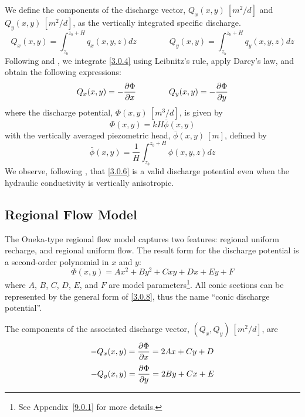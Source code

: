 \documentclass[12pt]{report}
\providecommand{\pderiv}[2]{\frac{\mathinner{\partial#1}}{\mathinner{\partial#2}}}
\begin{document}
We define the components of the discharge vector, $Q_x(x,y)~[m^2/d]$ and $Q_y(x,y)~[m^2/d]$, as the vertically integrated specific discharge.
%
\begin{equation}\label{3.0.4}
    Q_x(x,y) = \int_{z_b}^{z_b+H} q_x(x,y,z) dz
	\qquad \qquad
    Q_y(x,y) = \int_{z_b}^{z_b+H} q_y(x,y,z) dz
\end{equation}
%
Following \citet[p. 77-78]{Bear1979} and \citet{Strack06}, we integrate \eqref{3.0.4} using Leibnitz's rule, apply Darcy's law, and obtain the following expressions:
%
\begin{equation}\label{3.0.5}
    Q_x(x,y) = -\pderiv{\Phi}{x}
    \qquad\qquad
    Q_y(x,y) = -\pderiv{\Phi}{y}
\end{equation}
%
where the discharge potential, $\Phi(x,y)~[m^3/d]$, is given by
%
\begin{equation}\label{3.0.6}
    \Phi(x,y) = kH\bar{\phi}(x,y)
\end{equation}
%
with the vertically averaged piezometric head, $\bar{\phi}(x,y)~[m]$, defined by
%
\begin{equation}\label{3.0.7}
    \bar{\phi}(x,y) = \frac{1}{H} \int_{z_b}^{z_b+H} \phi(x,y,z) dz
\end{equation}
%
We observe, following \citet{Youngs66b}, that \eqref{3.0.6} is a valid discharge potential even when the hydraulic conductivity is vertically anisotropic.

\subsection{Regional Flow Model}
The Oneka-type regional flow model captures two features: regional uniform recharge, and regional uniform flow.  The result form for the discharge potential is a second-order polynomial in $x$ and $y$:
%
\begin{equation} \label{3.0.8}
    \Phi(x,y) = Ax^2 + By^2 + Cxy + Dx + Ey + F
\end{equation}
%
where $A$, $B$, $C$, $D$, $E$, and $F$ are model parameters\footnote{See Appendix~\ref{9.0.1} for more details.}. All conic sections can be represented by the general form of \eqref{3.0.8}, thus the name ``conic discharge potential''.

The components of the associated discharge vector, $(Q_x,Q_y)~[m^2/d]$, are
%
\begin{equation} \label{3.0.9}
    -Q_x(x,y) = \pderiv{\Phi}{x} = 2Ax + Cy + D
\end{equation}
%
\begin{equation} \label{3.0.10}
    -Q_y(x,y) = \pderiv{\Phi}{y} = 2By + Cx + E
\end{equation}
\end{document}
